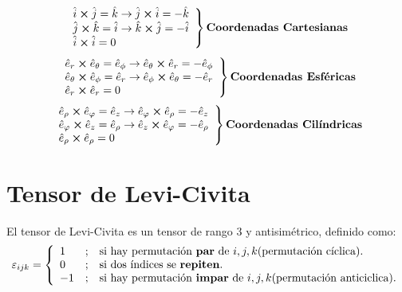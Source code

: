 \documentclass[../main]{subfiles}
\begin{document}
\begin{equation*}
    \left.
    \begin{array}{l}
         \hat{i} \cross \hat{j}=\hat{k} \rightarrow \hat{j}\cross \hat{i}=-\hat{k} \\
         \hat{j}\cross \hat{k}=\hat{i} \rightarrow \hat{k} \cross \hat{j}=-\hat{i} \\
         \hat{i} \cross \hat{i}=0
    \end{array}
    \right \}
    \textbf{Coordenadas Cartesianas}
\end{equation*}
\begin{equation*}
    \left.
    \begin{array}{l}
         \hat{e}_r \cross \hat{e}_{\theta}=\hat{e}_{\phi} \rightarrow \hat{e}_{\theta}\cross \hat{e}_{r}=-\hat{e}_{\phi} \\
         \hat{e}_{\theta} \cross \hat{e}_{\phi}=\hat{e}_r \rightarrow \hat{e}_{\phi} \cross \hat{e}_{\theta}=-\hat{e}_r \\
         \hat{e}_r \cross \hat{e}_r=0
    \end{array}
    \right \}
    \textbf{Coordenadas Esféricas}
\end{equation*}
\begin{equation*}
    \left.
    \begin{array}{l}
         \hat{e}_{\rho} \cross \hat{e}_{\varphi}=\hat{e}_z \rightarrow \hat{e}_{\varphi}\cross \hat{e}_{\rho}=-\hat{e}_z \\
         \hat{e}_{\varphi}\cross \hat{e}_z=\hat{e}_{\rho} \rightarrow \hat{e}_z \cross \hat{e}_{\varphi}=-\hat{e}_{\rho} \\
         \hat{e}_{\rho} \cross \hat{e}_{\rho}=0
    \end{array}
    \right \}
    \textbf{Coordenadas Cilíndricas}
\end{equation*}
\section{Tensor de Levi-Civita}
El tensor de Levi-Civita es un tensor de rango 3 y antisimétrico, definido como:
\begin{equation}
    \varepsilon_{ijk}=
    \left\{ 
    \begin{array}{lll}
          1  & ; & \text{si hay permutación \textbf{par} de $i,j,k$(permutación cíclica).}  \\
          0  & ; & \text{si dos índices se \textbf{repiten}.}  \\
         -1  & ; & \text{si hay permutación \textbf{impar} de $i,j,k$(permutación anticiclica).}
    \end{array} 
    \right. 
\end{equation}
\end{document}
